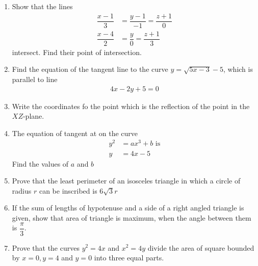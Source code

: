 \begin{enumerate}
    \item Show that the lines
          \begin{align*}
              \dfrac{x-1}{3} & = \dfrac{y-1}{-1} = \dfrac{z+1}{0} \\
              \dfrac{x-4}{2} & = \dfrac{y}{0} = \dfrac{z+1}{3}
          \end{align*}
          intersect. Find their point of intersection.
    \item Find the equation of the tangent line to the curve $y=\sqrt{5x-3} -5$, which is parallel to line
          \begin{align*}
              4x-2y+5=0
          \end{align*}
    \item Write the coordinates fo the point which is the reflection of the point \brak{\alpha,\beta,\gamma} in the $XZ$-plane.
    \item The equation of tangent at  on the curve
          \begin{align*}
              y^2 & = ax^3 + b \text { is} \\
              y   & = 4x -5
          \end{align*}
          Find the values of $a$ and $b$
    \item Prove that the least perimeter of an isosceles triangle in which a circle of radius $r$ can be inscribed is $6 \sqrt{3} r$
    \item If the sum of lengths of hypotenuse and a side of a right angled triangle is given, show that area of triangle is maximum, when the angle between them is $\dfrac{\pi}{3}$.
    \item Prove that the curves $y^2=4x$ and $x^2= 4y$ divide the area of square bounded by $x=0,y=4$ and $y=0$ into three equal parts.
\end{enumerate}